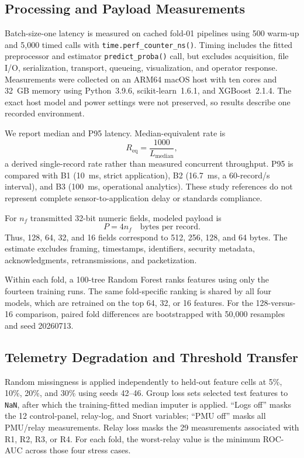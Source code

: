 \documentclass[conference]{IEEEtran}
\begin{document}
\FloatBarrier
\subsection{Processing and Payload Measurements}

Batch-size-one latency is measured on cached fold-01 pipelines using 500
warm-up and 5{,}000 timed calls with \texttt{time.perf\_counter\_ns()}. Timing
includes the fitted preprocessor and estimator \texttt{predict\_proba()} call,
but excludes acquisition, file I/O, serialization, transport, queueing,
visualization, and operator response. Measurements were collected on an ARM64
macOS host with ten cores and 32~GB memory using Python~3.9.6,
scikit-learn~1.6.1, and XGBoost~2.1.4. The exact host model and power settings
were not preserved, so results describe one recorded environment.

We report median and P95 latency. Median-equivalent rate is
\begin{equation}
R_{\mathrm{eq}}=\frac{1000}{L_{\mathrm{median}}},
\end{equation}
a derived single-record rate rather than measured concurrent throughput. P95
is compared with B1 (10~ms, strict application), B2 (16.7~ms, a 60-record/s
interval), and B3 (100~ms, operational analytics). These study references do
not represent complete sensor-to-application delay or standards compliance.

For $n_f$ transmitted 32-bit numeric fields, modeled payload is
\begin{equation}
P=4n_f \quad \text{bytes per record}.
\end{equation}
Thus, 128, 64, 32, and 16 fields correspond to 512, 256, 128, and 64 bytes.
The estimate excludes framing, timestamps, identifiers, security metadata,
acknowledgments, retransmissions, and packetization.

Within each fold, a 100-tree Random Forest ranks features using only the
fourteen training runs. The same fold-specific ranking is shared by all four
models, which are retrained on the top 64, 32, or 16 features. For the
128-versus-16 comparison, paired fold differences are bootstrapped with
50{,}000 resamples and seed 20260713.

\FloatBarrier
\subsection{Telemetry Degradation and Threshold Transfer}

Random missingness is applied independently to held-out feature cells at
5\%, 10\%, 20\%, and 30\% using seeds 42--46. Group loss sets selected test
features to \texttt{NaN}, after which the training-fitted median imputer is
applied. ``Logs off'' masks the 12 control-panel, relay-log, and Snort
variables; ``PMU off'' masks all PMU/relay measurements. Relay loss masks the
29 measurements associated with R1, R2, R3, or R4. For each fold, the
worst-relay value is the minimum ROC-AUC across those four stress cases.
\end{document}
